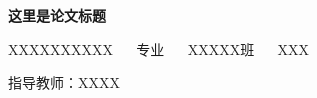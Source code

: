 \documentclass[12pt,a4paper,AutoFakeBold]{article}
\begin{document}
{ 
\mkls
\renewcommand{\abstractname}{\scriptsize}
\begin{center}
	{\hei{}\textbf{这里是论文标题}}\par
	{\song XXXXXXXXXX ~~ 专业 ~~ XXXXX班 ~~ XXX \par 
		指导教师：XXXX
	}
\end{center}


\begin{onecolabstract}
\par

\vspace{22pt}
\par
\end{onecolabstract}

\newpage
\begin{onecolabstract}
\par
	
\vspace{22pt}
\par
\end{onecolabstract}
}


\newpage
\renewcommand{\contentsname}{\centerline{\zihao{-2}\textbf{目录}}}
\linespread{1.2}\selectfont{
	\tableofcontents
}

\newpage
\end{document}
